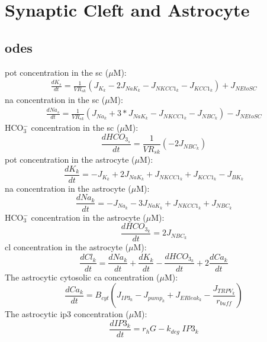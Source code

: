 \documentclass[11pt]{elsarticle}
\newcommand{\hco}{HCO$_3^-$\xspace}
\newcommand{\uM}{$\mu$M\xspace}
\newcommand{\na}{\gls{na}\xspace}
\newcommand{\pot}{\gls{pot}\xspace}
\newcommand{\cl}{\gls{cl}\xspace}
\newcommand{\ca}{\gls{ca}\xspace}
\newcommand{\ip}{\gls{ip3}\xspace}
\begin{document}
\section{Synaptic Cleft and Astrocyte}
%
\subsection{\Glspl{ode}}
%
\pot concentration in the \gls{sc} (\uM):
\begin{align}
\frac{d K_s}{dt} = \frac{1}{VR_{sk}} \left( J_{K_k} - 2 J_{NaK_k} - J_{NKCC1_k} - J_{KCC1_k} \right) + J_{NEtoSC}
\end{align}
%
\na concentration in the \gls{sc} (\uM):
\begin{align}
\frac{d Na_s}{dt} =  \frac{1}{VR_{sk}} \left( J_{Na_k} + 3*J_{NaK_k} - J_{NKCC1_k} - J_{NBC_k} \right) - J_{NEtoSC}
\end{align}
%
\hco concentration in the \gls{sc} (\uM):
\begin{equation} \label{eq:HCOEx}
\frac{d HCO_{3_{s}}}{dt}=  \frac{1}{VR_{sk}} \left( -2 J_{NBC_{k}} \right)
\end{equation} 
%
\pot concentration in the astrocyte (\uM):
\begin{equation} \label{eq:KInt}
\frac{d K_k}{dt}=- J_{K_k} + 2 J_{NaK_{k}} + J_{NKCC1_{k}} +  J_{KCC1_{k}}
- J_{BK_k}  
\end{equation}
%
\na concentration in the astrocyte (\uM):
\begin{equation} \label{eq:NaInt}
\frac{d Na_k}{dt}=-J_{Na_k} - 3 J_{NaK_{k}} + J_{NKCC1_{k}} +  J_{NBC_{k}}
\end{equation}
%
\hco concentration in the astrocyte (\uM):
\begin{equation} \label{eq:HCOInt}
\frac{d HCO_{3_k}}{dt}= 2 J_{NBC_{k}} 
\end{equation}
%
\cl concentration in the astrocyte (\uM):
\begin{equation} \label{eq:ClInt}
\frac{d Cl_k}{dt}= \frac{dNa_k}{dt} + \frac{dK_k}{dt} - \frac{d HCO_{3_{k}}}{dt} + 2 \frac{d Ca_k}{dt}
\end{equation}
%
The astrocytic cytosolic \ca concentration (\uM):
\begin{equation}
\frac{d Ca_k}{dt} = B_{cyt} \left( J_{IP3_k} - J_{pump_k} + J_{ERleak_k} - \frac{J_{TRPV_k}}{r_{buff}} \right)
\label{eq:ACca}
\end{equation}	
%
The astrocytic \ip concentration (\uM):
\begin{equation}
\frac{d IP3_k}{dt} = r_h G - k_{deg} \; IP3_k
\end{equation}
\end{document}
